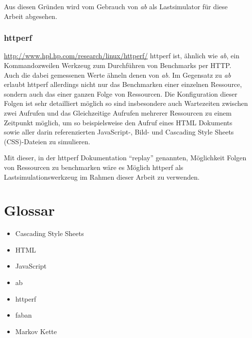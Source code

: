 \documentclass[1p]{scrartcl}
\begin{document}
  Aus diesen Gründen wird vom Gebrauch von \textit{ab} als Lastsimulator für diese Arbeit
  abgesehen.
  
  \subsubsection{httperf}
  \url{http://www.hpl.hp.com/research/linux/httperf/}
  httperf ist, ähnlich wie \textit{ab}, ein Kommandozweilen Werkzeug zum
  Durchführen von Benchmarks per HTTP. Auch die dabei gemessenen Werte ähneln
  denen von \textit{ab}. Im Gegensatz zu \textit{ab} erlaubt httperf allerdings
  nicht nur das Benchmarken einer einzelnen Ressource, sondern auch das einer
  ganzen Folge von Ressourcen. Die Konfiguration dieser Folgen ist sehr 
  detailliert möglich so sind insbesondere auch Wartezeiten zwischen zwei 
  Aufrufen und das Gleichzeitige Aufrufen mehrerer Ressourcen zu einem Zeitpunkt
  möglich, um so beispielsweise den Aufruf eines HTML Dokuments sowie aller
  darin referenzierten JavaScript-, Bild- und 
  Cascading Style Sheets (CSS)-Dateien zu simulieren.
  
  Mit dieser, in der httperf Dokumentation ``replay'' genannten,
  Möglichkeit Folgen von Ressourcen zu benchmarken wäre es Möglich httperf als
  Lastsimulationswerkzeug im Rahmen dieser Arbeit zu verwenden.
  
    
  \section{Glossar}
  \begin{itemize}
    \item Cascading Style Sheets
    \item HTML
    \item JavaScript
    \item ab
    \item httperf
    \item faban
    \item Markov Kette
  \end{itemize}
\end{document}
